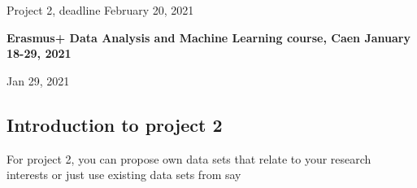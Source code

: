 \documentclass[%
oneside,                 %
final,                   %
10pt]{article}
\begin{document}

\newcommand{\exercisesection}[1]{\subsection*{#1}}






\thispagestyle{empty}

\begin{center}
{\LARGE\bf
\begin{spacing}{1.25}
Project 2, deadline February 20, 2021
\end{spacing}
}
\end{center}


\begin{center}
{\bf Erasmus+ Data Analysis and Machine Learning course, Caen January 18-29, 2021${}^{}$} \\ [0mm]
\end{center}

\begin{center}
\end{center}
    

\begin{center}
Jan 29, 2021
\end{center}

\vspace{1cm}


\subsection*{Introduction to project 2}

For project 2, you can propose own data sets that relate to your
research interests or just use existing data sets from say
\end{document}
